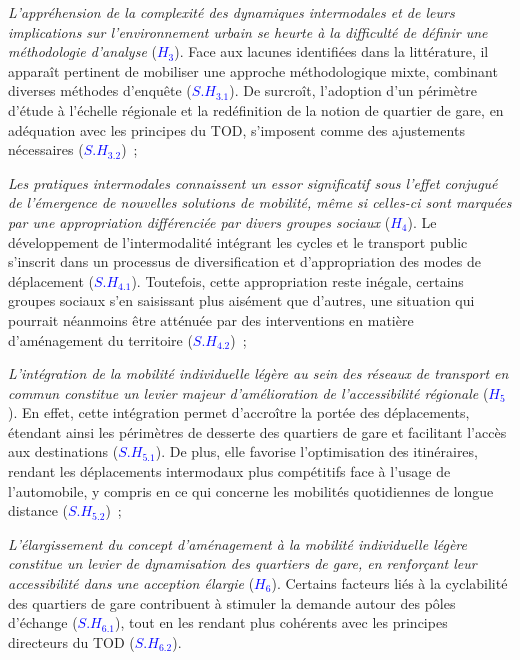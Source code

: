 \begin{refsegment}
\begin{customitemize}
    \item \textsl{L’appréhension de la complexité des dynamiques intermodales et de leurs implications sur l’environnement urbain se heurte à la difficulté de définir une méthodologie d’analyse} ({\textcolor{blue}{\(H_3\)}\label{hypothese-3}}). Face aux lacunes identifiées dans la littérature, il apparaît pertinent de mobiliser une approche méthodologique mixte, combinant diverses méthodes d’enquête ({\textcolor{blue}{\(S.H_{3.1}\)}\label{sous-hypothese-3.1}}). De surcroît, l’adoption d’un périmètre d’étude à l’échelle régionale et la redéfinition de la notion de quartier de gare, en adéquation avec les principes du \acrshort{TOD}, s’imposent comme des ajustements nécessaires ({\textcolor{blue}{\(S.H_{3.2}\)}\label{sous-hypothese-3.2}})~;
    \item \textsl{Les pratiques intermodales connaissent un essor significatif sous l’effet conjugué de l’émergence de nouvelles solutions de mobilité, même si celles-ci sont marquées par une appropriation différenciée par divers groupes sociaux} ({\textcolor{blue}{\(H_4\)}\label{hypothese-4}}). Le développement de l’intermodalité intégrant les cycles et le transport public s’inscrit dans un processus de diversification et d'appropriation des modes de déplacement ({\textcolor{blue}{\(S.H_{4.1}\)}\label{sous-hypothese-4.1}}). Toutefois, cette appropriation reste inégale, certains groupes sociaux s’en saisissant plus aisément que d’autres, une situation qui pourrait néanmoins être atténuée par des interventions en matière d’aménagement du territoire ({\textcolor{blue}{\(S.H_{4.2}\)}\label{sous-hypothese-4.2}})~;
    \item \textsl{L’intégration de la mobilité individuelle légère au sein des réseaux de transport en commun constitue un levier majeur d’amélioration de l’accessibilité régionale} ({\textcolor{blue}{\(H_5\)}\label{hypothese-5}}). En effet, cette intégration permet d’accroître la portée des déplacements, étendant ainsi les périmètres de desserte des quartiers de gare et facilitant l’accès aux destinations ({\textcolor{blue}{\(S.H_{5.1}\)}\label{sous-hypothese-5.1}}). De plus, elle favorise l’optimisation des itinéraires, rendant les déplacements intermodaux plus compétitifs face à l’usage de l’automobile, y compris en ce qui concerne les mobilités quotidiennes de longue distance ({\textcolor{blue}{\(S.H_{5.2}\)}\label{sous-hypothese-5.2}})~;
    \item \textsl{L’élargissement du concept d’aménagement à la mobilité individuelle légère constitue un levier de dynamisation des quartiers de gare, en renforçant leur accessibilité dans une acception élargie} ({\textcolor{blue}{\(H_6\)}\label{hypothese-6}}). Certains facteurs liés à la cyclabilité des quartiers de gare contribuent à stimuler la demande autour des pôles d’échange ({\textcolor{blue}{\(S.H_{6.1}\)}\label{sous-hypothese-6.1}}), tout en les rendant plus cohérents avec les principes directeurs du \acrshort{TOD} ({\textcolor{blue}{\(S.H_{6.2}\)}\label{sous-hypothese-6.2}}).
\end{customitemize}%


\end{refsegment}
